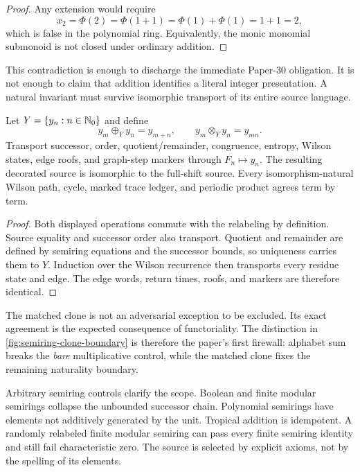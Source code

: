 \begin{proof}
Any extension would require
\[
  x_2=\Phi(2)=\Phi(1+1)=\Phi(1)+\Phi(1)=1+1=2,
\]
which is false in the polynomial ring.  Equivalently, the monic monomial
submonoid is not closed under ordinary addition.
\end{proof}

This contradiction is enough to discharge the immediate Paper-30 obligation.
It is not enough to claim that addition identifies a literal integer
presentation.  A natural invariant must survive isomorphic transport of its
entire source language.

\begin{proposition}
\label{prop:matched-clone}
Let $Y=\{y_n:n\in\mathbb N_0\}$ and define
\[
  y_m\oplus_Yy_n=y_{m+n},
  \qquad
  y_m\otimes_Yy_n=y_{mn}.
\]
Transport successor, order, quotient/remainder, congruence, entropy, Wilson
states, edge roofs, and graph-step markers through $F_n\mapsto y_n$.  The
resulting decorated source is isomorphic to the full-shift source.  Every
isomorphism-natural Wilson path, cycle, marked trace ledger, and periodic
product agrees term by term.
\end{proposition}

\begin{proof}
Both displayed operations commute with the relabeling by definition.  Source
equality and successor order also transport.  Quotient and remainder are
defined by semiring equations and the successor bounds, so uniqueness carries
them to $Y$.  Induction over the Wilson recurrence then transports every
residue state and edge.  The edge words, return times, roofs, and markers are
therefore identical.
\end{proof}

The matched clone is not an adversarial exception to be excluded.  Its exact
agreement is the expected consequence of functoriality.  The distinction in
\cref{fig:semiring-clone-boundary} is therefore the paper's first firewall:
alphabet sum breaks the \emph{bare} multiplicative control, while the matched
clone fixes the remaining naturality boundary.

Arbitrary semiring controls clarify the scope.  Boolean and finite modular
semirings collapse the unbounded successor chain.  Polynomial semirings have
elements not additively generated by the unit.  Tropical addition is
idempotent.  A randomly relabeled finite modular semiring can pass every finite
semiring identity and still fail characteristic zero.  The source is selected
by explicit axioms, not by the spelling of its elements.
